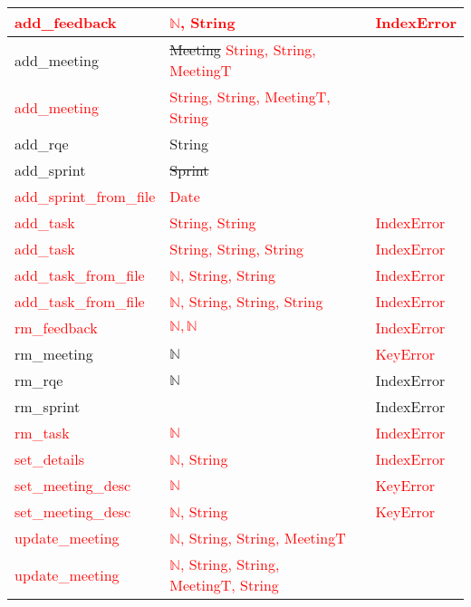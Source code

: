 \documentclass[12pt, titlepage]{article}
\begin{document}
\begin{tabular}{|l|l|l|l|}
    \hline
    \textcolor{red}{add\_feedback} & \textcolor{red}{$\mathbb{N}$, String} & & \textcolor{red}{IndexError}\\
    \hline
    add\_meeting & \sout{Meeting} \textcolor{red}{String, String, MeetingT}& & \\
    \hline
    \textcolor{red}{add\_meeting} & \textcolor{red}{String, String, MeetingT, String}& & \\
    \hline
    add\_rqe & String & & \\
    \hline
    add\_sprint & \sout{Sprint} & & \\
    \hline
    \textcolor{red}{add\_sprint\_from\_file} & \textcolor{red}{Date} & & \\
    \hline
    \textcolor{red}{add\_task} & \textcolor{red}{String, String}& & \textcolor{red}{IndexError}\\
    \hline
    \textcolor{red}{add\_task} & \textcolor{red}{String, String, String}& & \textcolor{red}{IndexError}\\
    \hline
    \textcolor{red}{add\_task\_from\_file} & \textcolor{red}{$\mathbb{N}$, String, String} & & \textcolor{red}{IndexError}\\
    \hline
    \textcolor{red}{add\_task\_from\_file} & \textcolor{red}{$\mathbb{N}$, String, String, String} & & \textcolor{red}{IndexError}\\
    \hline
    \textcolor{red}{rm\_feedback} & \textcolor{red}{$\mathbb{N,N}$} & & \textcolor{red}{IndexError}\\
    \hline
    rm\_meeting & $\mathbb{N}$ &  & \textcolor{red}{KeyError}\\
    \hline
    rm\_rqe & $\mathbb{N}$ &  & IndexError\\
    \hline
    rm\_sprint & & & IndexError\\
    \hline
    \textcolor{red}{rm\_task} & \textcolor{red}{$\mathbb{N}$} & & \textcolor{red}{IndexError}\\
    \hline
    \textcolor{red}{set\_details} & \textcolor{red}{$\mathbb{N}$, String} & & \textcolor{red}{IndexError}\\
    \hline
    \textcolor{red}{set\_meeting\_desc} & \textcolor{red}{$\mathbb{N}$} & & \textcolor{red}{KeyError}\\
    \hline
    \textcolor{red}{set\_meeting\_desc} & \textcolor{red}{$\mathbb{N}$, String} & &\textcolor{red}{KeyError}\\
    \hline
    \textcolor{red}{update\_meeting} & \textcolor{red}{$\mathbb{N}$, String, String, MeetingT}& & \\
    \hline
    \textcolor{red}{update\_meeting} & \textcolor{red}{$\mathbb{N}$, String, String, MeetingT, String}& & \\
    \hline
\end{tabular}
\end{document}
